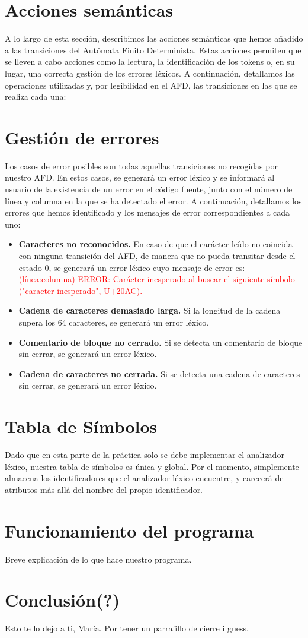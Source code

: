 \documentclass{article}
\begin{document}
\vspace{0.1cm}


\section{Acciones semánticas}
A lo largo de esta sección, describimos las acciones semánticas que hemos añadido a las transiciones del Autómata Finito Determinista. Estas acciones permiten que se lleven a cabo acciones como la lectura, la identificación de los tokens o, en su lugar, una correcta gestión de los errores léxicos. A continuación, detallamos las operaciones utilizadas y, por legibilidad en el AFD, las transiciones en las que se realiza cada una:\\


\section{Gestión de errores}
Los casos de error posibles son todas aquellas transiciones no recogidas por nuestro AFD. En estos casos, se generará un error léxico y se informará al usuario de la existencia de un error en el código fuente, junto con el número de línea y columna en la que se ha detectado el error. A continuación, detallamos los errores que hemos identificado y los mensajes de error correspondientes a cada uno:\\
\begin{itemize}[left=1cm]
    \item \textbf{Caracteres no reconocidos.} En caso de que el carácter leído no coincida con ninguna transición del AFD, de manera que no pueda transitar desde el estado 0, se generará un error léxico cuyo mensaje de error es: \textcolor{red}{(línea:columna) ERROR: Carácter inesperado al buscar el siguiente símbolo ("caracter inesperado", U+20AC).}
    \item \textbf{Cadena de caracteres demasiado larga.} Si la longitud de la cadena supera los 64 caracteres, se generará un error léxico.
    \item \textbf{Comentario de bloque no cerrado.} Si se detecta un comentario de bloque sin cerrar, se generará un error léxico.
    \item \textbf{Cadena de caracteres no cerrada.} Si se detecta una cadena de caracteres sin cerrar, se generará un error léxico.
\end{itemize}

\section{Tabla de Símbolos}
Dado que en esta parte de la práctica solo se debe implementar el analizador léxico, nuestra tabla de símbolos es única y global. Por el momento, simplemente almacena los identificadores que el analizador léxico encuentre, y carecerá de atributos más allá del nombre del propio identificador.

\section{Funcionamiento del programa}
Breve explicación de lo que hace nuestro programa.
\section{Conclusión(?)}
Esto te lo dejo a ti, María. Por tener un parrafillo de cierre i guess.
\end{document}
